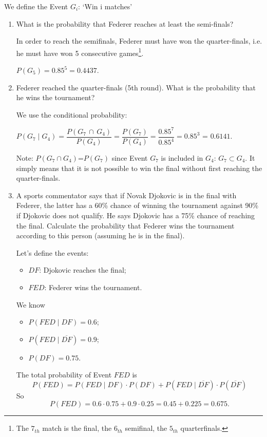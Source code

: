 \documentclass[12pt,thmsa]{article}
\begin{document}
We define the Event $G_i$: `Win i matches'
\begin{enumerate} %

\item What is the probability that Federer reaches at least the semi-finals?

In order to reach the semifinals, Federer must have won the quarter-finals, i.e. he must have won 5 consecutive games\footnote{The $7_{th}$ match is the final, the $6_{th}$ semifinal, the $5_{th}$ quarterfinals.}.
\begin{center} $P(G_5)=0.85^5=0.4437$.
\end{center}

\item Federer reached the quarter-finals (5th round). What is the probability that he wins the tournament?

We use the conditional probability:
\begin{center} $P(G_7 \mid G_4)= \dfrac{P(G_7 \,\cap\, G_4)}{P(G_4)}=\dfrac{P(G_7)}{P(G_4)}=\dfrac{0.85^7}{0.85^4}=0.85^3$ = $0.6141.$
\end{center}

Note: $P(G_7 \cap G_4)$=$P(G_7)$ since Event $G_7$ is included in $G_4$: $G_7 \subset G_4$. It simply means that it is not possible to win the final without first reaching the quarter-finals.

\item A sports commentator says that if Novak Djokovic is in the final with Federer, the latter has a 60\% chance of winning the tournament against 90\% if Djokovic does not qualify.
 He says Djokovic has a 75\% chance of reaching the final. Calculate the probability that Federer wins the tournament according to this person (assuming he is in the final).

Let's define the events:
\begin{itemize}
\item $DF$: Djokovic reaches the final;
\item $FED$: Federer wins the tournament.
\end{itemize}

We know \begin{itemize} \item $P(FED \mid DF)=0.6$; \item $P(FED \mid \overline{DF})=0.9$; \item $P(DF)=0.75$. \end{itemize}

The total probability of Event $FED$ is
$$
P(FED)=P(FED \mid DF)\cdot P(DF) + P(FED \mid \overline{DF}) \cdot
P(\overline{DF})
$$
So
$$P(FED)= 0.6\cdot 0.75 + 0.9\cdot 0.25 = 0.45+0.225 = 0.675.$$ 
\end{enumerate}
\end{document}
